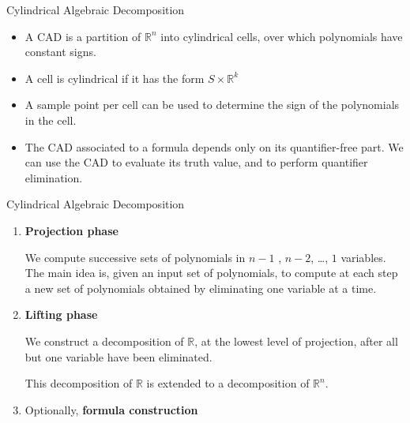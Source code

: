 \documentclass{beamer}
\begin{document}
\begin{frame}{Cylindrical Algebraic Decomposition}
    \begin{itemize}
        \item A CAD is a partition of $\mathbb{R}^n$ into cylindrical cells, over which polynomials have constant signs.
        \item A cell is cylindrical if it has the form $S \times \mathbb{R}^k$
        \item A sample point per cell can be used to determine the sign of the polynomials in the cell.
        \item The CAD associated to a formula depends only on its quantifier-free part. We can use the CAD to evaluate its truth value, and to perform quantifier elimination.
    \end{itemize}
\end{frame}

\begin{frame}{Cylindrical Algebraic Decomposition}
    \begin{enumerate}
        \item \textbf{Projection phase}

            We compute successive sets of polynomials in $n - 1$ , $n - 2$, \dots, $1$ variables. The main idea is, given an input set of polynomials, to compute at each step a new set of polynomials obtained by eliminating one variable at a time.

        \item \textbf{Lifting phase}

            We construct a decomposition of $\mathbb{R}$, at the lowest level of projection, after all but one variable have been eliminated.
            
            This decomposition of $\mathbb{R}$ is extended to a decomposition of $\mathbb{R}^n$.

        \item Optionally, \textbf{formula construction}
    \end{enumerate}
\end{frame}
\end{document}
